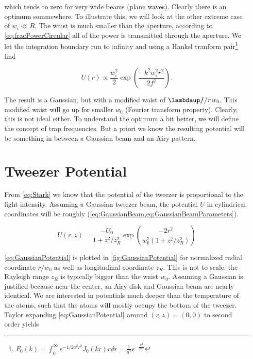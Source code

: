 which tends to zero for very wide beams (plane waves). Clearly there is an optimum sommewhere.
To illustrate this, we will look at the other extreme case of $w_i \ll R$. 
The waist is much smaller than the aperture, according to \cref{eq:fracPowerCircular} all of the power is transmitted through the aperture.
We let the integration boundary run to infinity and using a Hankel tranform pair\footnote{$F_0(k) = \int_0^{\infty} e^{-1/2 a^2 r^2} J_0(k r)r dr = \frac{1}{a^2} e^{-\frac{k^2}{2a^2}}$} find 

\begin{equation}\label{eq:GaussianCase}
    U(r) \propto \frac{w_i^2}{2} \exp{\left(\frac{-k^2w_i^2 r^2}{2f^2}\right)}.
\end{equation}

The result is a Gaussian, but with a modified waist of $\lambdaup f / \pi w_0$.
This modified waist will go up for smaller $w_0$ (Fourier transform property). 
Clearly, this is not ideal either. 
To understand the optimum a bit better, we will define the concept of trap frequencies. 
But a priori we know the resulting potential will be something in between a Gaussian beam and an Airy pattern. 

\section{Tweezer Potential}

From \cref{eq:Stark} we know that the potential of the tweezer is proportional to the light intensity. Assuming a Gaussian tweezer beam, the potential $U$ in cylindrical coordinates will be roughly (\cref{eq:GaussianBeam,eq:GaussianBeamParameters}).

\begin{equation}\label{eq:GaussianPotential}
    U(r,z)=\frac{-U_{0}}{1+z^{2} / z_{R}^{2}} \exp \left(\frac{-2 r^{2}}{w_{0}^{2}\left(1+z^{2} / z_{R}^{2}\right)}\right)
\end{equation}

\cref{eq:GaussianPotential} is plotted in \cref{fig:GaussianPotential} for normalized radial coordinate $r/w_0$ as well as longitudinal coordinate $z_R$. 
This is not to scale: the Rayleigh range $z_R$ is typically bigger than the waist $w_0$.
Assuming a Gaussian is justified because near the center, an Airy disk and Gaussian beam are nearly identical.
We are interested in potentials much deeper than the temperature of the atoms, such that the atoms will mostly occupy the bottom of the tweezer. 
Taylor expanding \cref{eq:GaussianPotential} around $(r,z)=(0,0)$ to second order yields 

